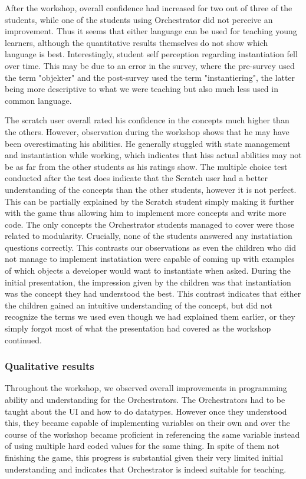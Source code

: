 After the workshop, overall confidence had increased for two out of three of the students, while one of the students using Orchestrator did not perceive an improvement. Thus it seems  that either language can be used for teaching young learners, although the quantitative results themselves do not show which language is best. Interestingly, student self perception regarding instantiation fell over time. This may be due to an error in the survey, where the pre-survey used the term "objekter" and the post-survey used the term "instantiering", the latter being more descriptive to what we were teaching but also much less used in common language.

The scratch user overall rated his confidence in the concepts much higher than the others. However, observation during the workshop shows that he may have been overestimating his abilities. He generally stuggled with state management and instantiation while working, which indicates that hiss actual abilities may not be as far from the other students as his ratings show. The multiple choice test conducted after the test does indicate that the Scratch user had a better understanding of the concepts than the other students, however it is not perfect. This can be partially explained by the Scratch student simply making it further with the game thus allowing him to implement more concepts and write more code. The only concepts the Orchestrator students managed to cover were those related to modularity.  Crucially, none of the students answered any instatiation questions correctly. This contrasts our observations as even the children who did not manage to implement instatiation were capable of coming up with examples of which objects a developer would want to instantiate when asked. During the initial presentation, the impression given by the children was that  instantiation was the concept they had understood the best. This contrast indicates that either the children gained an intuitive understanding of the concept, but did not recognize the terms we used even though we had explained them earlier, or they simply forgot most of what the presentation had covered as the workshop continued.



\subsubsection{Qualitative results}
Throughout the workshop, we observed overall improvements in programming ability and understanding for the Orchestrators.  The Orchestrators had to be taught about the UI and how to do datatypes. However once they understood this, they became capable of implementing variables on their own and over the course of the workshop became proficient in referencing the same variable instead of using multiple hard coded values for the same thing. In spite of them not finishing the game, this progress is substantial given their very limited initial understanding and indicates that Orchestrator is indeed suitable for teaching.

